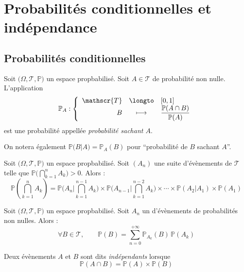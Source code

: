 \documentclass[11pt,a4paper,fleqn,pdftex]{report}
\begin{document}
\section{Probabilités conditionnelles et indépendance} %
\label{sec:independance}
\subsection{Probabilités conditionnelles} %
\label{sub:probabilites_conditionnelles}
\begin{itheorem}
     Soit $\big( \Omega , \mathscr{T}, \mathbb{P} \big)$ un espace propbabilisé. \newline
     Soit $A \in \mathscr{T}$ de probabilité non nulle. \\
     L'application 
     \begin{equation}
     \mathbb{P}_A : \left\lbrace
     \begin{array}{r c l}
          \mathscr{T} &\longto & [0,1] \\
          B &\longmapsto & \dfrac{\mathbb{P} (A\cap B)}{\mathbb{P} (A)}
     \end{array}
     \right.
     \end{equation}
     est une probabilité appellée \emph{probabilité sachant $A$}.
\end{itheorem}
On notera également $\mathbb{P}\big( B | A\big) = \mathbb{P}_A(B)$ pour ``probabilité de $B$ sachant $A$''.
\begin{theorem}
     Soit $\big( \Omega , \mathscr{T}, \mathbb{P} \big)$ un espace propbabilisé. \newline
     Soit $(A_n)$ une suite d'évènements de $\mathscr{T}$ telle que $\mathbb{P} \Big( \bigcap_{k=1}^n A_k \Big) > 0$. Alors :
     \begin{equation}
     \mathbb{P} \left( \bigcap_{k=1}^n A_k \right) = \mathbb{P}\Bigg(A_n \Bigg| \bigcap_{k=1}^{n-1} A_k \Bigg) \times \mathbb{P}\Bigg(A_{n-1} \Bigg| \bigcap_{k=1}^{n-2} A_k \Bigg) \times \cdots \times \mathbb{P}(A_2|A_1) \times \mathbb{P}(A_1)
     \end{equation}
\end{theorem}
\begin{itheorem}
     Soit $\big( \Omega , \mathscr{T}, \mathbb{P} \big)$ un espace propbabilisé. \newline
     Soit $A_n$ un  d'évènements de probabilités non nulles. Alors :
     \begin{equation}
     \forall B\in \mathscr{T},\qquad \mathbb{P}(B) = \sum_{n=0}^{+\infty} \mathbb{P}_{A_k}(B)\, \mathbb{P}(A_k)
     \end{equation}
\end{itheorem}
\begin{dfn}
     Deux évènements $A$ et $B$ sont dits \emph{indépendants} lorsque 
     \begin{equation}
     \mathbb{P}(A\cap B) = \mathbb{P}(A)\times \mathbb{P}(B)
     \end{equation}
\end{dfn}
\end{document}
